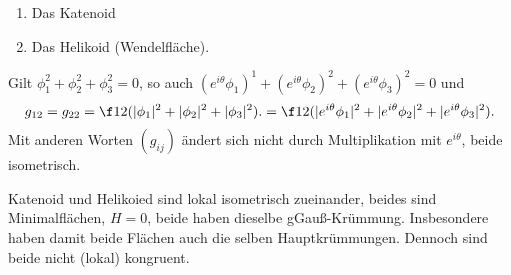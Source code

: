 \begin{ex}
	\begin{enumerate}[2.]
		\item
			Das Katenoid
		\item
			Das Helikoid (Wendelfläche).
	\end{enumerate}
	Gilt $\phi_1^2 + \phi_2^2 + \phi_3^2 = 0$, so auch $(e^{i\theta} \phi_1)^1 + (e^{i\theta} \phi_2)^2 + (e^{i\theta} \phi_3)^2 = 0$ und
	\[
		g_{12}
		= g_{22}
		= \f 12 (|\phi_1|^2 + |\phi_2|^2 + |\phi_3|^2).
		= \f 12 (|e^{i\theta}\phi_1|^2 + |e^{i\theta} \phi_2|^2 + |e^{i\theta} \phi_3|^2).
	\]
	Mit anderen Worten $(g_{ij})$ ändert sich nicht durch Multiplikation mit $e^{i\theta}$, beide isometrisch.

	Katenoid und Helikoied sind lokal isometrisch zueinander, beides sind Minimalflächen, $H = 0$, beide haben dieselbe gGauß-Krümmung.
	Insbesondere haben damit beide Flächen auch die selben Hauptkrümmungen.
	Dennoch sind beide nicht (lokal) kongruent.
\end{ex}

